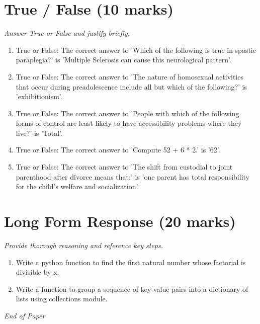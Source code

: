 \documentclass[12pt]{article}
\begin{document}
\section*{True / False (10 marks)}
\textit{Answer True or False and justify briefly.}
\begin{enumerate}[label=\arabic*.]
\item True or False: The correct answer to 'Which of the following is true in spastic paraplegia?' is 'Multiple Sclerosis can cause this neurological pattern'.
\item True or False: The correct answer to 'The nature of homosexual activities that occur during preadolescence include all but which of the following?' is 'exhibitionism'.
\item True or False: The correct answer to 'People with which of the following forms of control are least likely to have accessibility problems where they live?' is 'Total'.
\item True or False: The correct answer to 'Compute 52 + 6 * 2.' is '62'.
\item True or False: The correct answer to 'The shift from custodial to joint parenthood after divorce means that:' is 'one parent has total responsibility for the child's welfare and socialization'.
\end{enumerate}

\section*{Long Form Response (20 marks)}
\textit{Provide thorough reasoning and reference key steps.}
\begin{enumerate}[label=\arabic*.]
\item Write a python function to find the first natural number whose factorial is divisible by
x.
\item Write a function to group a sequence of key-value pairs into a dictionary of lists using
collections module.
\end{enumerate}

\vfill
\noindent\textit{End of Paper}
\end{document}
